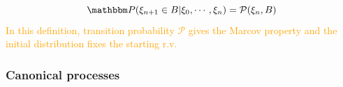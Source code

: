 \documentclass[12pt, reqno]{amsart}
\newcommand{\1}{\mathbbm 1}
\newcommand{\pP}{\mathcal P}
\newcommand{\PP}{\mathbbm P}
\theoremstyle{plain}
\theoremstyle{definition}
\begin{document}
\begin{equation*}
      \PP(\xi_{n+1}\in B|\xi_0,\cdots,\xi_n)=\pP(\xi_n,B)
\end{equation*}
\textcolor{orange}{In this definition, transition probability $\pP$ gives the Marcov property and the initial distribution fixes the starting r.v.  }
\subsubsection{Canonical processes} %
\newpage


\end{document}

